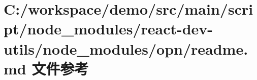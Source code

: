 \hypertarget{node__modules_2react-dev-utils_2node__modules_2opn_2_r_e_a_d_m_e_8md}{}\section{C\+:/workspace/demo/src/main/script/node\+\_\+modules/react-\/dev-\/utils/node\+\_\+modules/opn/readme.md 文件参考}
\label{node__modules_2react-dev-utils_2node__modules_2opn_2_r_e_a_d_m_e_8md}
